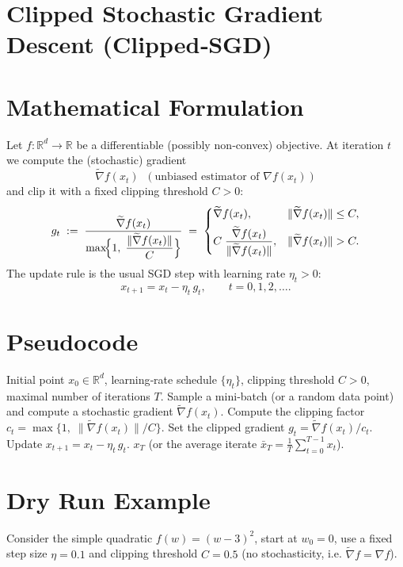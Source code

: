 \documentclass{article}
\begin{document}
\section*{Clipped Stochastic Gradient Descent (Clipped‑SGD)}

\section*{Mathematical Formulation}
Let $f:\mathbb{R}^{d}\rightarrow\mathbb{R}$ be a differentiable (possibly non‑convex) objective.  
At iteration $t$ we compute the (stochastic) gradient
\[
\widetilde{\nabla}f(x_{t})\;\;(\text{unbiased estimator of }\nabla f(x_{t}))
\]
and clip it with a fixed clipping threshold $C>0$:
\[
g_{t}\;:=\;\frac{\widetilde{\nabla}f(x_{t})}
{\displaystyle \max\!\Bigl\{1,\;\frac{\|\widetilde{\nabla}f(x_{t})\|}{C}\Bigr\}}
\;=\;
\begin{cases}
\widetilde{\nabla}f(x_{t}), & \|\widetilde{\nabla}f(x_{t})\|\le C,\\[4pt]
C\;\dfrac{\widetilde{\nabla}f(x_{t})}{\|\widetilde{\nabla}f(x_{t})\|}, & \|\widetilde{\nabla}f(x_{t})\|> C .
\end{cases}
\]
The update rule is the usual SGD step with learning rate $\eta_{t}>0$:
\[
x_{t+1}=x_{t}-\eta_{t}\,g_{t},\qquad t=0,1,2,\dots .
\]

\section*{Pseudocode}
\begin{algorithm}[H]
\caption{Clipped‑SGD}
\begin{algorithmic}[1]
\REQUIRE Initial point $x_{0}\in\mathbb{R}^{d}$, learning‑rate schedule $\{\eta_{t}\}$,
 clipping threshold $C>0$, maximal number of iterations $T$.
    \STATE Sample a mini‑batch (or a random data point) and compute a stochastic gradient 
    $\widetilde{\nabla}f(x_{t})$.
    \STATE Compute the clipping factor 
    $c_{t}= \max\!\bigl\{1,\;\|\widetilde{\nabla}f(x_{t})\|/C\bigr\}$.
    \STATE Set the clipped gradient $g_{t}= \widetilde{\nabla}f(x_{t})/c_{t}$.
    \STATE Update $x_{t+1}=x_{t}-\eta_{t}\,g_{t}$.
\ENDFOR
\ENSURE $x_{T}$ (or the average iterate $\bar x_{T}=\frac1T\sum_{t=0}^{T-1}x_{t}$).
\end{algorithmic}
\end{algorithm}

\section*{Dry Run Example}
Consider the simple quadratic $f(w)=(w-3)^{2}$, start at $w_{0}=0$, use a fixed step size
$\eta=0.1$ and clipping threshold $C=0.5$ (no stochasticity, i.e. $\widetilde{\nabla}f=\nabla f$).
\end{document}
